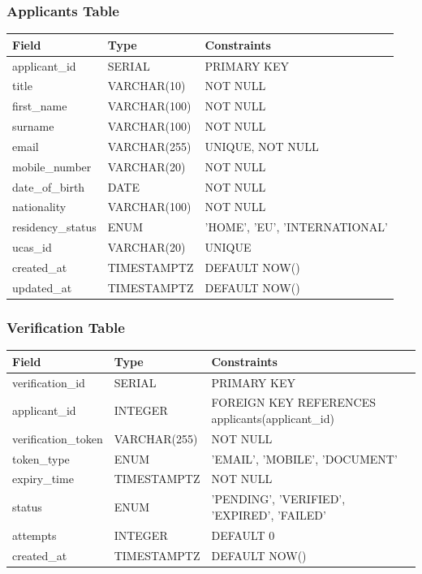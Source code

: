 \documentclass[11pt]{article}
\begin{document}
\subsubsection*{Applicants Table}
\begin{tabular}{|l|l|l|}
    \hline
    \textbf{Field} & \textbf{Type} & \textbf{Constraints} \\
    \hline
    applicant\_id & SERIAL & PRIMARY KEY \\
    title & VARCHAR(10) & NOT NULL \\
    first\_name & VARCHAR(100) & NOT NULL \\
    surname & VARCHAR(100) & NOT NULL \\
    email & VARCHAR(255) & UNIQUE, NOT NULL \\
    mobile\_number & VARCHAR(20) & NOT NULL \\
    date\_of\_birth & DATE & NOT NULL \\
    nationality & VARCHAR(100) & NOT NULL \\
    residency\_status & ENUM & 'HOME', 'EU', 'INTERNATIONAL' \\
    ucas\_id & VARCHAR(20) & UNIQUE \\
    created\_at & TIMESTAMPTZ & DEFAULT NOW() \\
    updated\_at & TIMESTAMPTZ & DEFAULT NOW() \\
    \hline
\end{tabular}
\label{tab:applicants_schema}
\vspace{1em}

\subsubsection*{Verification Table}
\begin{tabular}{|l|l|l|}
    \hline
    \textbf{Field} & \textbf{Type} & \textbf{Constraints} \\
    \hline
    verification\_id & SERIAL & PRIMARY KEY \\
    applicant\_id & INTEGER & FOREIGN KEY REFERENCES applicants(applicant\_id) \\
    verification\_token & VARCHAR(255) & NOT NULL \\
    token\_type & ENUM & 'EMAIL', 'MOBILE', 'DOCUMENT' \\
    expiry\_time & TIMESTAMPTZ & NOT NULL \\
    status & ENUM & 'PENDING', 'VERIFIED', 'EXPIRED', 'FAILED' \\
    attempts & INTEGER & DEFAULT 0 \\
    created\_at & TIMESTAMPTZ & DEFAULT NOW() \\
    \hline
\end{tabular}
\label{tab:verification_schema}
\vspace{1em}
\end{document}
